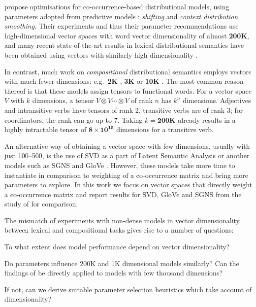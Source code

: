 \documentclass[11pt]{article}
\begin{document}
 propose optimisations for co-occurrence-based distributional models, using parameters adopted from predictive models \cite{mikolov2013efficient}: \emph{shifting} and \emph{context distribution smoothing}. Their experiments and thus their parameter  recommendations use high-dimensional vector spaces with word vector dimensionality of almost \textbf{200K}, and many recent state-of-the-art results in lexical distributional semantics have been obtained using vectors with similarly high dimensionality  \cite{baroni-dinu-kruszewski:2014:P14-1,kiela-clark:2014:CVSC,lapesa2014large}.

In contrast, much work on \emph{compositional} distributional semantics employs vectors with much fewer dimensions: e.g.~\textbf{2K} \cite{Grefenstette:2011:ESC:2145432.2145580,kartsadrqpl2014,milajevs-EtAl:2014:EMNLP2014}, \textbf{3K} \cite{Dinu:2010:MDS:1870658.1870771,milajevs-purver:2014:CVSC} or \textbf{10K} \cite{polajnar-clark:2014:EACL,Baroni2010nouns}. The most common reason thereof is that these models  assign tensors to functional words. For a vector space $V$ with $k$ dimensions,  a tensor $V \otimes V \cdots \otimes V$ of rank $n$ has $k^n$ dimensions. Adjectives and intransitive verbs have tensors of rank 2, transitive verbs are of rank 3; for coordinators, the rank can go up to 7. Taking $k = \textbf{200K}$ already results in a highly intractable tensor of $\textbf{8} \times \textbf{10}^{\textbf{15}}$ dimensions for a transitive verb.

An alternative way of obtaining a vector space with few dimensions, usually with just 100--500, is the use of SVD as a part of Latent Semantic Analysis \cite{ARIS:ARIS1440380105} or another models such as SGNS \cite{mikolov2013efficient} and GloVe \cite{pennington2014glove}. However, these models take more time to instantiate in comparison to weighting of a co-occurrence matrix and bring more parameters to explore. In this work we focus on vector spaces that directly weight a co-occurrence matrix and report results for SVD, GloVe and SGNS from the study of  for comparison.

The mismatch of experiments with non-dense models in vector dimensionality between lexical and compositional tasks gives rise to a number of questions:
\begin{compactitem}
\item To what extent does model performance depend on vector dimensionality?
\item Do parameters influence 200K and 1K dimensional models similarly? Can the findings of  be directly applied to models with few thousand dimensions?
\item If not, can we derive suitable parameter selection heuristics which take account of dimensionality?
\end{compactitem}
\end{document}
